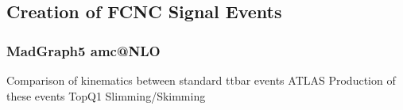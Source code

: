 \subsection{Creation of FCNC Signal Events}
\label{Sec:MG5Sig}
\subsubsection{MadGraph5 amc@NLO}
Comparison of kinematics between standard ttbar events
ATLAS Production of these events
TopQ1 Slimming/Skimming








%
%
%
%
%

